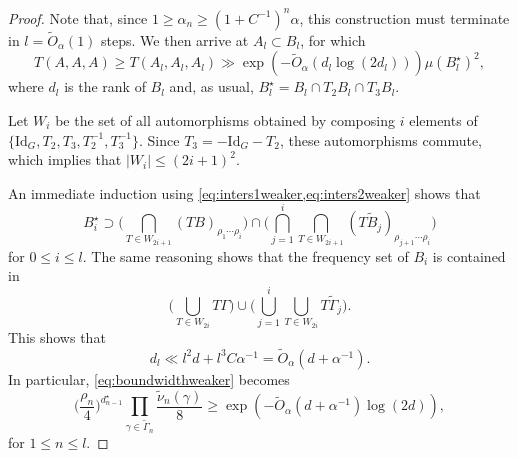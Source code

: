 \documentclass{daj}
\theoremstyle{definition}
\begin{document}
\begin{proof}
Note that, since $1\geq \alpha_n \geq (1+C^{-1})^n\alpha$, this construction must terminate in $l = \tilde{O}_{\alpha}(1)$ steps. We then arrive at $A_l\subset B_l$, for which 
\begin{equation}
\label{eq:TAAAweaker}
T(A, A, A) \geq T(A_l, A_l, A_l) \gg \exp \left(-\tilde{O}_{\alpha} \left(d_l \log(2d_l)\right) \right) \mu(B_l^{\star})^2,
\end{equation}
where $d_l$ is the rank of $B_l$ and, as usual, $B_l^{\star} = B_{l} \cap T_2 B_{l}\cap T_3 B_{l}$.

Let $W_i$ be the set of all automorphisms obtained by composing $i$ elements of $\{\mathrm{Id}_{G}, T_2, T_3, T_2^{-1}, T_3^{-1}\}$. Since $T_3 = -\mathrm{Id}_{G} - T_2$, these automorphisms commute, which implies that $|W_i| \leq (2i+1)^2$.

An immediate induction using \cref{eq:inters1weaker,eq:inters2weaker} shows that 
\begin{equation}
\label{eq:Bohrsetsweaker}
B_i^{\star} \supset \Bigg(\bigcap_{T\in W_{2i+1}} (TB)_{\rho_1\cdots \rho_i}\Bigg)  \cap\Bigg( \bigcap_{j=1}^{i} \bigcap_{T\in W_{2i+1}} (T \widetilde{B}_j)_{\rho_{j+1}\cdots \rho_i} \Bigg)
\end{equation}
for $0\leq i\leq l$. The same reasoning shows that the frequency set of $B_i$ is contained in 
\begin{equation*}
\Bigg(\bigcup_{T\in W_{2i}} T\Gamma\Bigg)  \cup\Bigg( \bigcup_{j=1}^{i} \bigcup_{T\in W_{2i}} T \widetilde{\Gamma}_j\Bigg).
\end{equation*}
This shows that
\begin{equation*}
d_{l} \ll l^2 d + l^3 C\alpha^{-1} = \tilde{O}_{\alpha}(d  + \alpha^{-1}).
\end{equation*}
In particular, \cref{eq:boundwidthweaker} becomes
\begin{equation}
\label{eq:boundwidthweaker3}
	\bigg(\frac{\rho_n}{4}\bigg)^{d_{n-1}^{\star}}\prod_{\gamma \in \widetilde{\Gamma}_n} \frac{\widetilde{\nu}_n(\gamma)}{8} \geq   \exp \left( -\tilde{O}_{\alpha} \left(d+\alpha^{-1}\right)\log (2d) \right),
\end{equation}
for $1\leq n \leq l$. 


\end{proof}
\end{document}
